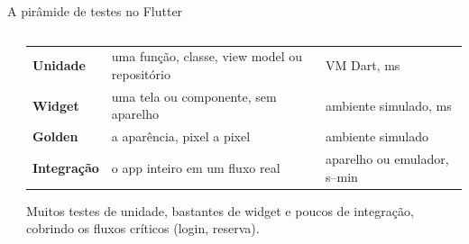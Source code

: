 \documentclass[aspectratio=169,10pt]{beamer}
\begin{document}
\begin{frame}{A pirâmide de testes no Flutter}
  \begin{columns}[c]
    \begin{column}{0.44\textwidth}
      \centering
    \end{column}
    \begin{column}{0.54\textwidth}
      \scriptsize
      \begin{tabularx}{\linewidth}{@{}l L p{1.75cm}@{}}
        \toprule
         &  &  \\
        \midrule
        \textbf{Unidade} & uma função, classe, view model ou repositório & VM Dart, ms \\
        \textbf{Widget} & uma tela ou componente, sem aparelho & ambiente simulado, ms \\
        \textbf{Golden} & a aparência, pixel a pixel & ambiente simulado \\
        \textbf{Integração} & o app inteiro em um fluxo real & aparelho ou emulador, s--min \\
        \bottomrule
      \end{tabularx}
      \begin{dica}
        Muitos testes de unidade, bastantes de widget e poucos de integração, cobrindo os fluxos críticos (login, reserva).
      \end{dica}
    \end{column}
  \end{columns}
\end{frame}

\end{document}
